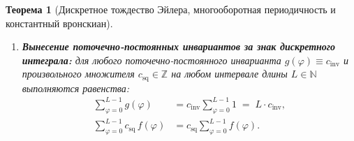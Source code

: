 \documentclass[11pt,a4paper]{article}
\theoremstyle{plain}
\newtheorem{theorem}{Теорема}[section]
\theoremstyle{definition}
\begin{document}
\begin{theorem}[Дискретное тождество Эйлера, многооборотная периодичность и константный вронскиан]
\begin{enumerate}[label=\textbf{(\roman*)},leftmargin=*]
\begin{equation}
    \label{eq:constant-wronskian-all-512}
    \mathcal{W}_Q(\varphi) \;=\; (Q - m)(m + 1) - m(Q - m - 1) \;\equiv\; Q
    \qquad (\forall Q, m \in \mathbb{Z}).
  \end{equation}
\item \textbf{Вынесение поточечно-постоянных инвариантов за знак дискретного интеграла:}
  для любого поточечно-постоянного инварианта $g(\varphi) \equiv c_{\mathrm{inv}}$ и произвольного множителя $c_{\mathrm{sq}} \in \mathbb{Z}$ на любом интервале длины $L \in \mathbb{N}$ выполняются равенства:
  \begin{align}
    \sum_{\varphi=0}^{L-1} g(\varphi) &= c_{\mathrm{inv}}\sum_{\varphi=0}^{L-1} 1 \;=\; L\cdot c_{\mathrm{inv}}, \label{eq:constant-extraction} \\
    \sum_{\varphi=0}^{L-1} c_{\mathrm{sq}}\,f(\varphi) &= c_{\mathrm{sq}}\sum_{\varphi=0}^{L-1} f(\varphi). \label{eq:linear-factor-extraction}
  \end{align}
\end{enumerate}
\end{theorem}
\end{document}
